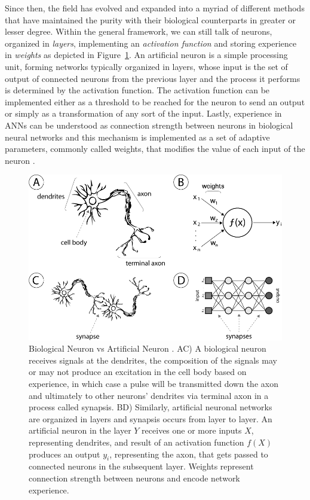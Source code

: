 Since then, the field has evolved and expanded into a myriad of different methods that have maintained the purity with their biological counterparts in greater or lesser degree.
Within the general framework, we can still talk of neurons, organized in \emph{layers}, implementing an \emph{activation function} and storing experience in \emph{weights} as depicted in Figure~\ref{fig:sec:theory:neurons}.
An artificial neuron is a simple processing unit, forming networks typically organized in layers, whose input is the set of output of connected neurons from the previous layer and the process it performs is determined by the activation function.
The activation function can be implemented either as a threshold to be reached for the neuron to send an output or simply as a transformation of any sort of the input.
Lastly, experience in ANNs can be understood as connection strength between neurons in biological neural networks and this mechanism is implemented as a set of adaptive parameters, commonly called weights, that modifies the value of each input of the neuron \cite{Hinton1990}.

\begin{figure}[htb]
  \includegraphics[width=\textwidth]{gfx/neurons}
  \caption{Biological Neuron vs Artificial Neuron \cite{Honorio2013}. AC) A biological neuron receives signals at the dendrites, the composition of the signals may or may not produce an excitation in the cell body based on experience, in which case a pulse will be transmitted down the axon and ultimately to other neurons' dendrites via terminal axon in a process called synapsis. BD) Similarly, artificial neuronal networks are organized in layers and synapsis occurs from layer to layer. An artificial neuron in the layer $Y$ receives one or more inputs $X$, representing dendrites, and result of an activation function $f(X)$ produces an output $y_i$, representing the axon, that gets passed to connected neurons in the subsequent layer. Weights represent connection strength between neurons and encode network experience.}
  \label{fig:sec:theory:neurons}
\end{figure}

